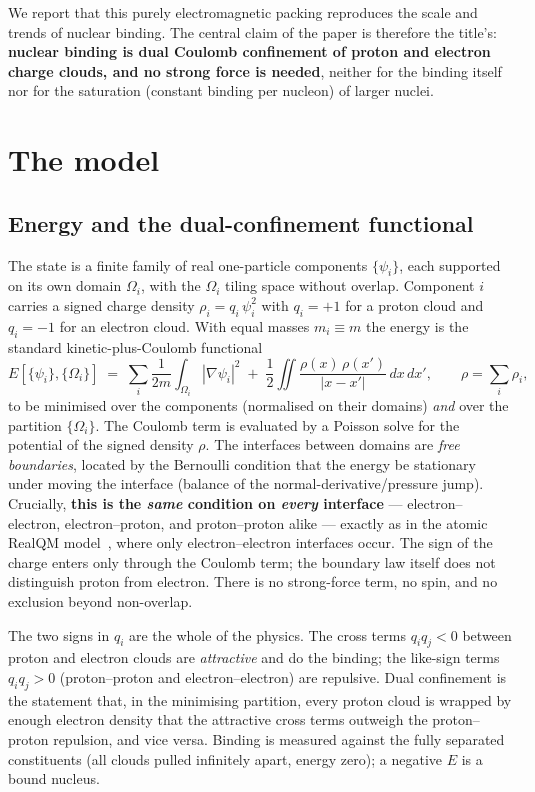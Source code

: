 \documentclass[11pt]{article}
\begin{document}
We report that this purely electromagnetic packing reproduces the scale and trends of nuclear
binding. The central claim of the paper is therefore the title's: \textbf{nuclear binding is
dual Coulomb confinement of proton and electron charge clouds, and no strong force is needed},
neither for the binding itself nor for the saturation (constant binding per nucleon) of larger
nuclei.

\section{The model}

\subsection{Energy and the dual-confinement functional}

The state is a finite family of real one-particle components $\{\psi_i\}$, each supported on
its own domain $\Omega_i$, with the $\Omega_i$ tiling space without overlap. Component $i$
carries a signed charge density $\rho_i = q_i\,\psi_i^2$ with $q_i=+1$ for a proton cloud and
$q_i=-1$ for an electron cloud. With equal masses $m_i\equiv m$ the energy is the standard
kinetic-plus-Coulomb functional
\begin{equation}
E[\{\psi_i\},\{\Omega_i\}]
 \;=\; \sum_i \frac{1}{2m}\int_{\Omega_i}|\nabla\psi_i|^2
 \;+\; \frac12\iint \frac{\rho(x)\,\rho(x')}{|x-x'|}\,dx\,dx',
 \qquad \rho=\sum_i \rho_i ,
\label{eq:energy}
\end{equation}
to be minimised over the components (normalised on their domains) \emph{and} over the partition
$\{\Omega_i\}$. The Coulomb term is evaluated by a Poisson solve for the potential of the
signed density $\rho$. The interfaces between domains are \emph{free boundaries}, located by
the Bernoulli condition that the energy be stationary under moving the interface (balance of
the normal-derivative/pressure jump). Crucially, \textbf{this is the \emph{same} condition on
\emph{every} interface} --- electron--electron, electron--proton, and proton--proton alike ---
exactly as in the atomic RealQM model~\cite{Johnson-Atoms}, where only electron--electron
interfaces occur. The sign of the charge enters only through the Coulomb term; the boundary
law itself does not distinguish proton from electron. There is no strong-force term, no spin,
and no exclusion beyond non-overlap.

The two signs in $q_i$ are the whole of the physics. The cross terms $q_iq_j<0$ between proton
and electron clouds are \emph{attractive} and do the binding; the like-sign terms $q_iq_j>0$
(proton--proton and electron--electron) are repulsive. Dual confinement is the statement that,
in the minimising partition, every proton cloud is wrapped by enough electron density that the
attractive cross terms outweigh the proton--proton repulsion, and vice versa. Binding is
measured against the fully separated constituents (all clouds pulled infinitely apart, energy
zero); a negative $E$ is a bound nucleus.
\end{document}
